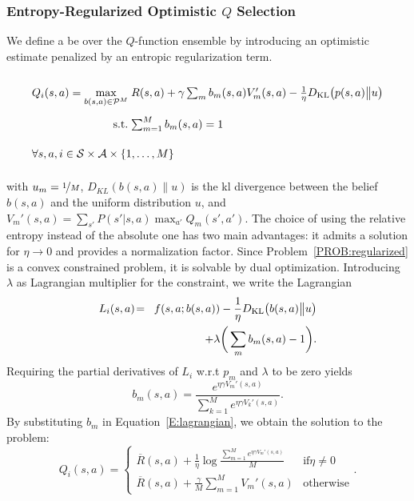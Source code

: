 \subsubsection{Entropy-Regularized Optimistic $Q$ Selection}
We define a \gls{be} over the $Q$-function ensemble by introducing an optimistic estimate penalized by an entropic regularization term.
\begin{probdef}
\begin{equation}
\arraycolsep=1.4pt\def\arraystretch{2.2}
\begin{array}{rrclcl}
\displaystyle Q_i(s,a) = \max_{b(s,a) \in \mathcal{P}^M} & \multicolumn{3}{l}{R(s,a) + \gamma \sum_m{b}_m(s,a)V_m'(s,a)-\frac{1}{\eta}D_{\mathrm{KL}}\big(p(s,a)\big{\|}u\big) } \\
\textrm{s.t.} & \sum_{m=1}^{M} b_m(s,a) & = & 1 \\
\multicolumn{4}{l}{ \forall s,a,i \in \mathcal{S} \times \mathcal{A} \times \{1,\dots,M\}}
\end{array}\nonumber
\end{equation}\label{PROB:regularized}
\end{probdef}
\noindent with $u_m  =  \nicefrac{1}{M}$, $D_{KL}(b(s,a)\| u)$ is the \gls{kl} divergence between the belief $b(s,a)$ and the uniform distribution $u$, and $V_m'(s,a) \! = \! \sum_{s'} P(s'|s,a)\max_{a'}Q_m(s',a')$.
The choice of using the relative entropy instead of the absolute one has two main advantages: it admits a solution for $\eta \to 0$ and provides a normalization factor.
Since Problem~\ref{PROB:regularized} is a convex constrained problem, it is solvable by dual optimization. Introducing $\lambda$ as Lagrangian multiplier for the constraint, we write the Lagrangian
\begin{eqnarray}
L_i(s,a) \!&=& \!f(s,a; b(s,a)) -\frac{1}{\eta}D_{\mathrm{KL}}\big(b(s,a)\big{\|}u\big)\nonumber \\ && + \lambda\bigg(\sum_m b_m(s,a) - 1\bigg).\label{E:lagrangian}
\end{eqnarray}
Requiring the partial derivatives of $L_i$ w.r.t $p_m$ and $\lambda$ to be zero yields 
\begin{equation}
b_m(s,a) = \frac{e^{\eta  \gamma V_m'(s,a)}}{\sum_{k=1}^{M} e^{\eta \gamma   V_k'(s,a)}}\label{pm}.
\end{equation} 
By substituting $b_m$ in Equation~\ref{E:lagrangian}, we obtain the solution to the problem:
\begin{equation}
Q_i(s,a) = \begin{cases}
\overline{R}(s,a) + \frac{1}{\eta} \log \frac{\sum_{m=1}^Me^{\eta \gamma  V_m'(s,a) }}{M} & \mathrm{if} \eta \neq 0 \label{OBE} \\
\overline{R}(s,a) + \frac{\gamma}M \sum_{m=1}^{M} V_m'(s,a) & \mathrm{otherwise}
\end{cases}.
\end{equation}
